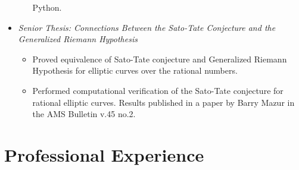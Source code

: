 \documentclass{article}
\begin{document}
\begin{itemize}
\begin{itemize}
        Python.
    \end{itemize}
  \item {\it Senior Thesis: Connections Between the Sato-Tate Conjecture
    and the Generalized Riemann Hypothesis}
    \begin{itemize}
      \item Proved equivalence of Sato-Tate conjecture and Generalized
        Riemann Hypothesis for elliptic curves over the rational
        numbers.
      \item Performed computational verification of the Sato-Tate
        conjecture for rational elliptic curves. Results published in a
        paper by Barry Mazur in the AMS Bulletin v.45 no.2.
    \end{itemize}

\end{itemize}




\section*{Professional Experience}
\end{document}
